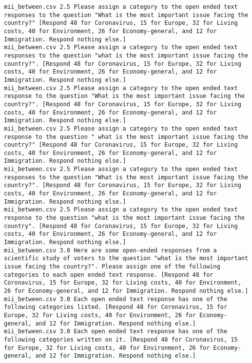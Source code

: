 \begin{lstlisting}
mii_between.csv	2.5	Please assign a category to the open ended text responses to the question "What is the most important issue facing the country?" [Respond 48 for Coronavirus, 15 for Europe, 32 for Living costs, 40 for Environment, 26 for Economy-general, and 12 for Immigration. Respond nothing else.]
mii_between.csv	2.5	Please assign a category to the open ended text responses to the question "what is the most important issue facing the country?". [Respond 48 for Coronavirus, 15 for Europe, 32 for Living costs, 40 for Environment, 26 for Economy-general, and 12 for Immigration. Respond nothing else.]
mii_between.csv	2.5	Please assign a category to the open ended text response to the question "What is the most important issue facing the country?". [Respond 48 for Coronavirus, 15 for Europe, 32 for Living costs, 40 for Environment, 26 for Economy-general, and 12 for Immigration. Respond nothing else.]
mii_between.csv	2.5	Please assign a category to the open ended text response to the question " what is the most important issue facing the country?" [Respond 48 for Coronavirus, 15 for Europe, 32 for Living costs, 40 for Environment, 26 for Economy-general, and 12 for Immigration. Respond nothing else.]
mii_between.csv	2.5	Please assign a category to the open ended text responses to the question "What is the most important issue facing the country?". [Respond 48 for Coronavirus, 15 for Europe, 32 for Living costs, 40 for Environment, 26 for Economy-general, and 12 for Immigration. Respond nothing else.]
mii_between.csv	2.5	Please assign a category to the open ended text response to the question "what is the most important issue facing the country". [Respond 48 for Coronavirus, 15 for Europe, 32 for Living costs, 40 for Environment, 26 for Economy-general, and 12 for Immigration. Respond nothing else.]
mii_between.csv	3.0	Here are some open-ended responses from a scientific study of voters to the question "what is the most important issue facing the country?". Please assign one of the following categories to each open ended text response. [Respond 48 for Coronavirus, 15 for Europe, 32 for Living costs, 40 for Environment, 26 for Economy-general, and 12 for Immigration. Respond nothing else.]
mii_between.csv	3.0	Each open ended text response has one of the following categories listed. [Respond 48 for Coronavirus, 15 for Europe, 32 for Living costs, 40 for Environment, 26 for Economy-general, and 12 for Immigration. Respond nothing else.]
mii_between.csv	3.0	Each open ended text response has one of the following categories written on it. [Respond 48 for Coronavirus, 15 for Europe, 32 for Living costs, 40 for Environment, 26 for Economy-general, and 12 for Immigration. Respond nothing else.]

\end{lstlisting}
